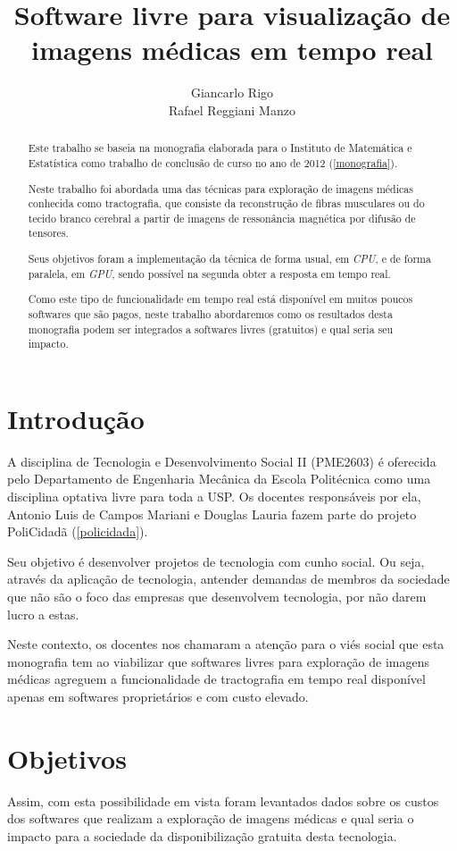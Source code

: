 \documentclass[a4paper,11pt]{report}
\title{Software livre para visualização de imagens médicas em tempo real}
\author{Giancarlo Rigo\\
        Rafael Reggiani Manzo}
\begin{document}
\maketitle
\tableofcontents

\begin{abstract}
Este trabalho se baseia na monografia elaborada para o Instituto de Matemática e Estatística como trabalho de conclusão de curso no ano de 2012 (\ref{monografia}).

Neste trabalho foi abordada uma das técnicas para exploração de imagens médicas conhecida como tractografia, que consiste da reconstrução de fibras musculares ou do tecido branco cerebral a partir de imagens de ressonância magnética por difusão de tensores.

Seus objetivos foram a implementação da técnica de forma usual, em \textit{CPU}, e de forma paralela, em \textit{GPU}, sendo possível na segunda obter a resposta em tempo real.

Como este tipo de funcionalidade em tempo real está disponível em muitos poucos softwares que são pagos, neste trabalho abordaremos como os resultados desta monografia podem ser integrados a softwares livres (gratuitos) e qual seria seu impacto.
\end{abstract}

\chapter{Introdução}
A disciplina de Tecnologia e Desenvolvimento Social II (PME2603) é oferecida pelo Departamento de Engenharia Mecânica da Escola Politécnica como uma disciplina optativa livre para toda a USP. Os docentes responsáveis por ela, Antonio Luis de Campos Mariani e Douglas Lauria fazem parte do projeto PoliCidadã (\ref{policidada}).

Seu objetivo é desenvolver projetos de tecnologia com cunho social. Ou seja, através da aplicação de tecnologia, antender demandas de membros da sociedade que não são o foco das empresas que desenvolvem tecnologia, por não darem lucro a estas.

Neste contexto, os docentes nos chamaram a atenção para o viés social que esta monografia tem ao viabilizar que softwares livres para exploração de imagens médicas agreguem a funcionalidade de tractografia em tempo real disponível apenas em softwares proprietários e com custo elevado.

\chapter{Objetivos}
Assim, com esta possibilidade em vista foram levantados dados sobre os custos dos softwares que realizam a exploração de imagens médicas e qual seria o impacto para a sociedade da disponibilização gratuita desta tecnologia.
\end{document}
